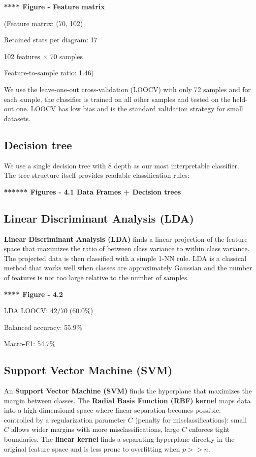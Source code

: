 \documentclass{birkjour}
\theoremstyle{definition}
\theoremstyle{remark}
\numberwithin{equation}{section}
\begin{document}
\textbf{**** Figure - Feature matrix} 

(Feature matrix: (70, 102)

Retained stats per diagram: 17

102 features × 70 samples

Feature-to-sample ratio: 1.46)

We use the leave-one-out cross-validation (LOOCV) with only 72 samples and for each sample, the classifier is trained on all other samples and tested on the held-out one. LOOCV has low bias and is the standard validation strategy for small datasets.

\subsection{Decision tree}\quad

We use a single decision tree with 8 depth as our most interpretable classifier. The tree structure itself provides readable
classification rules:


\textbf{******  Figures - 4.1 Data Frames + Decision trees}


\subsection{Linear Discriminant Analysis (LDA)}
\quad

\textbf{Linear Discriminant Analysis (LDA)} finds a linear projection of the feature space that maximizes the ratio of between class variance to within class variance. 
The projected data is then classified with a simple 1-NN rule.
LDA is a classical method that works well when classes are approximately Gaussian and the number of features is not too large relative to the number of samples.


\textbf{**** Figure - 4.2}

LDA LOOCV: 42/70 (60.0\%)

Balanced accuracy: 55.9\%

Macro-F1: 54.7\%



\subsection{Support Vector Machine (SVM)}\quad

An \textbf{Support Vector Machine (SVM)} finds the hyperplane that maximizes the margin between classes. 
The \textbf{Radial Basis Function (RBF)} \textbf{kernel} maps data into a high-dimensional space where linear separation becomes possible, controlled by a regularization parameter \(C\) (penalty for misclassifications): small \(C\) allows wider margins with more misclassifications, large \(C\) enforces tight boundaries. 
The \textbf{linear kernel} finds a separating hyperplane directly in the original feature space and is less prone to overfitting when \(p>>n\).
\end{document}
